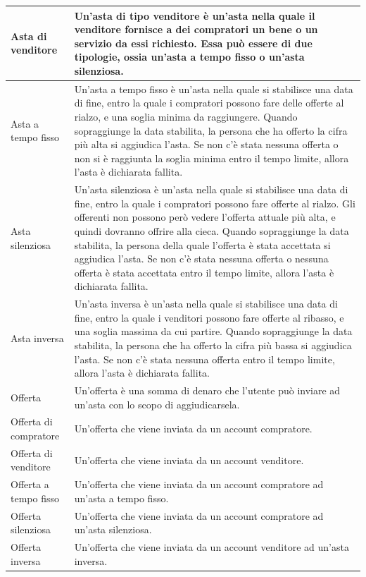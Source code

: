 \begin{longtable}{|C{3.5cm}|L{11.2cm}|}
            \hline
                Asta di venditore &
                Un'asta di tipo venditore è un'asta nella quale il venditore fornisce a dei compratori un bene o un servizio da essi richiesto. Essa può essere di due tipologie, ossia un'asta a tempo fisso o un'asta silenziosa.\\
            \hline
                Asta a tempo fisso &
                Un'asta a tempo fisso è un'asta nella quale si stabilisce una data di fine, entro la quale i compratori possono fare delle offerte al rialzo, e una soglia minima da raggiungere. Quando sopraggiunge la data stabilita, la persona che ha offerto la cifra più alta si aggiudica l'asta. Se non c'è stata nessuna offerta o non si è raggiunta la soglia minima entro il tempo limite, allora l'asta è dichiarata fallita.\\
            \hline
                Asta silenziosa &
                Un'asta silenziosa è un'asta nella quale si stabilisce una data di fine, entro la quale i compratori possono fare offerte al rialzo. Gli offerenti non possono però vedere l'offerta attuale più alta, e quindi dovranno offrire alla cieca. Quando sopraggiunge la data stabilita, la persona della quale l'offerta è stata accettata si aggiudica l'asta. Se non c'è stata nessuna offerta o nessuna offerta è stata accettata entro il tempo limite, allora l'asta è dichiarata fallita.\\
            \hline
                Asta inversa &
                Un'asta inversa è un'asta nella quale si stabilisce una data di fine, entro la quale i venditori possono fare offerte al ribasso, e una soglia massima da cui partire. Quando sopraggiunge la data stabilita, la persona che ha offerto la cifra più bassa si aggiudica l'asta. Se non c'è stata nessuna offerta entro il tempo limite, allora l'asta è dichiarata fallita.\\
            \hline
                Offerta &
                Un'offerta è una somma di denaro che l'utente può inviare ad un'asta con lo scopo di aggiudicarsela.\\
            \hline
                Offerta di compratore &
                Un'offerta che viene inviata da un account compratore.\\
            \hline
                Offerta di venditore &
                Un'offerta che viene inviata da un account venditore.\\
            \hline
                 Offerta a tempo fisso &
                Un'offerta che viene inviata da un account compratore ad un'asta a tempo fisso.\\
            \hline
                Offerta silenziosa &
                Un'offerta che viene inviata da un account compratore ad un'asta silenziosa.\\
            \hline
                Offerta inversa &
                Un'offerta che viene inviata da un account venditore ad un'asta inversa.\\
            \hline
        \end{longtable}
        
